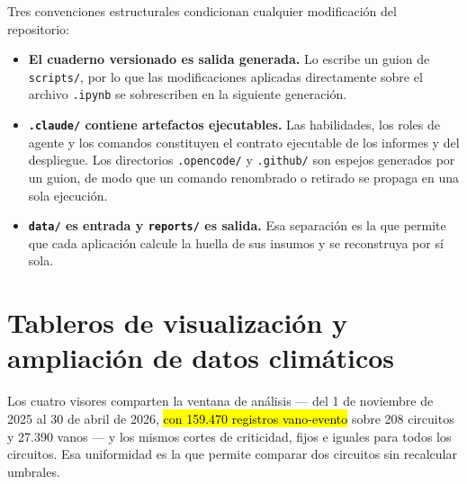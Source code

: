 \documentclass[11pt,a4paper]{article}
\newcommand{\nv}[1]{\hl{#1}}
\begin{document}
Tres convenciones estructurales condicionan cualquier modificación del repositorio:

\begin{itemize}
  \item \textbf{El cuaderno versionado es salida generada.} Lo escribe un guion de
        \texttt{scripts/}, por lo que las modificaciones aplicadas directamente sobre el
        archivo \texttt{.ipynb} se sobrescriben en la siguiente generación.
  \item \textbf{\texttt{.claude/} contiene artefactos ejecutables.} Las habilidades, los
        roles de agente y los comandos constituyen el contrato ejecutable de los informes y
        del despliegue. Los directorios \texttt{.opencode/} y \texttt{.github/} son espejos
        generados por un guion, de modo que un comando renombrado o retirado se propaga en
        una sola ejecución.
  \item \textbf{\texttt{data/} es entrada y \texttt{reports/} es salida.} Esa separación es
        la que permite que cada aplicación calcule la huella de sus insumos y se reconstruya
        por sí sola.
\end{itemize}

\section{Tableros de visualización y ampliación de datos climáticos}
\label{sec:tableros}

Los cuatro visores comparten la ventana de análisis --- del 1 de noviembre de 2025 al 30 de
abril de 2026, \nv{con 159.470 registros vano-evento} sobre 208 circuitos y 27.390 vanos --- y
los mismos cortes de criticidad, fijos e iguales para todos los circuitos. Esa uniformidad es la
que permite comparar dos circuitos sin recalcular umbrales.
\end{document}
